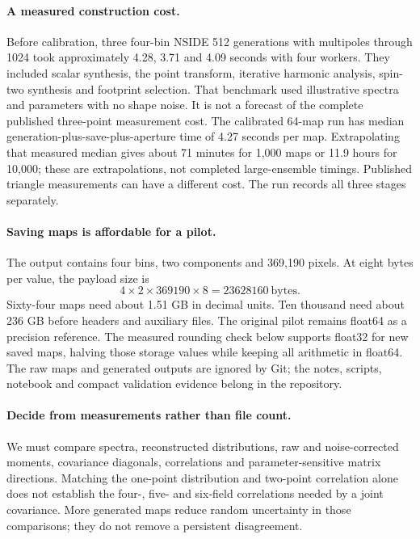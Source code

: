 \documentclass[11pt]{article}
\begin{document}
\paragraph{A measured construction cost.}
Before calibration, three four-bin NSIDE 512 generations with multipoles
through 1024 took approximately 4.28, 3.71 and 4.09 seconds with four
workers. They included scalar synthesis, the point transform, iterative
harmonic analysis, spin-two synthesis and footprint selection. That
benchmark used illustrative spectra and parameters with no shape noise.
It is not a forecast of the complete published three-point measurement
cost. The calibrated 64-map run has median generation-plus-save-plus-aperture
time of 4.27 seconds per map. Extrapolating that measured median gives about
71 minutes for 1,000 maps or 11.9 hours for 10,000; these are extrapolations,
not completed large-ensemble timings. Published triangle measurements can
have a different cost. The run records all three stages separately.

\paragraph{Saving maps is affordable for a pilot.}
The output contains four bins, two components and 369,190 pixels. At eight
bytes per value, the payload size is
\begin{equation}
 4\times2\times369190\times8=23628160\ \mathrm{bytes}.
\end{equation}
Sixty-four maps need about 1.51 GB in decimal units. Ten thousand need
about 236 GB before headers and auxiliary files. The original pilot remains float64 as a precision reference. The measured
rounding check below supports float32 for new saved maps, halving those
storage values while keeping all arithmetic in float64.
The raw maps and generated outputs are ignored by Git; the notes, scripts,
notebook and compact validation evidence belong in the repository.

\paragraph{Decide from measurements rather than file count.}
We must compare spectra, reconstructed distributions, raw and noise-corrected
moments, covariance diagonals, correlations and parameter-sensitive matrix
directions. Matching the one-point distribution and two-point correlation
alone does not establish the four-, five- and six-field correlations needed
by a joint covariance. More generated maps reduce random uncertainty in
those comparisons; they do not remove a persistent disagreement.
\end{document}
